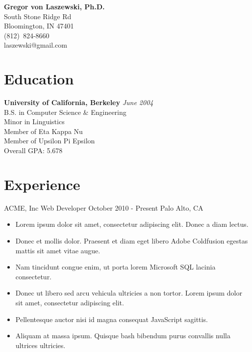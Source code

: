 \documentclass{article}
\begin{document}
\begin{center}
{\huge\bf Gregor von Laszewski, Ph.D.} \\
 South Stone Ridge Rd\\
Bloomington, IN 47401\\
(812)~824-8660\\
laszewski@gmail.com\\
\end{center}



\section{Education}

{\bf University of California, Berkeley} \hfill {\em June 2004} \\ 
B.S. in Computer Science \& Engineering \\
Minor in Linguistics \smallskip \\
Member of Eta Kappa Nu \\
Member of Upsilon Pi Epsilon \\
Overall GPA: 5.678
\bigskip



\section{Experience}

ACME, Inc
Web Developer
October 2010 - Present
Palo Alto, CA

\begin{itemize}
\item Lorem ipsum dolor sit amet, consectetur adipiscing elit. Donec a diam lectus.
\item Donec et mollis dolor. Praesent et diam eget libero Adobe Coldfusion egestas mattis sit amet vitae augue.
\item Nam tincidunt congue enim, ut porta lorem Microsoft SQL lacinia consectetur.
\item Donec ut libero sed arcu vehicula ultricies a non tortor. Lorem ipsum dolor sit amet, consectetur adipiscing elit.
\item Pellentesque auctor nisi id magna consequat JavaScript sagittis.
\item Aliquam at massa ipsum. Quisque bash bibendum purus convallis nulla ultrices ultricies.
\end{itemize}
\end{document}
